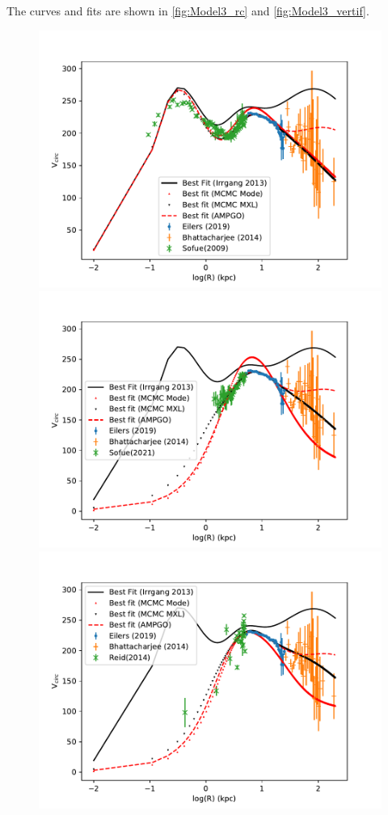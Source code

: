 \documentclass[fleqn,usenatbib]{mnras}
\begin{document}
The curves and fits are shown in \ref{fig:Model3_rc} and \ref{fig:Model3_vertif}.


\begin{figure}
\includegraphics[width=\columnwidth]{Model_III/Plots/Sofue(2009)/Rotcur_ModelIII_log_10000_100.pdf}
\includegraphics[width=\columnwidth]{Model_III/Plots/Sofue(2021)/Rotcur_ModelIII_log_10000_100.pdf}
\includegraphics[width=\columnwidth]{Model_III/Plots/Reid(2014)/Rotcur_ModelIII_log_10000_100.pdf}

\end{figure}
\end{document}
